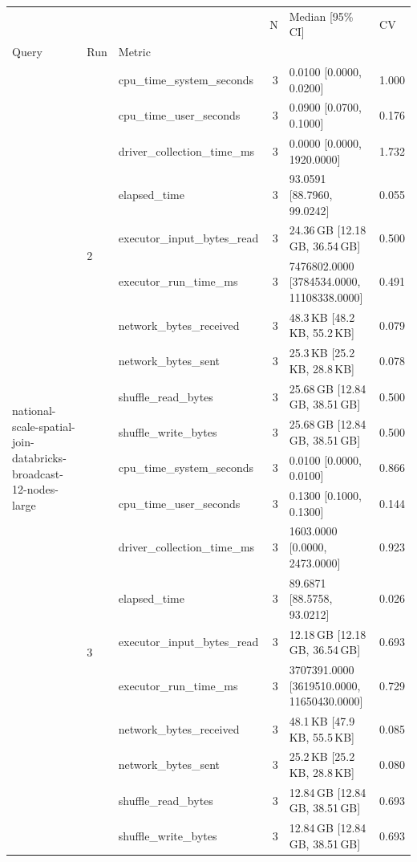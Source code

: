 \begin{tabular}{lllrll}
\toprule
 &  &  & N & Median [95\% CI] & CV \\
Query & Run & Metric &  &  &  \\
\midrule
\multirow[t]{20}{*}{national-scale-spatial-join-databricks-broadcast-12-nodes-large} & \multirow[t]{10}{*}{2} & cpu_time_system_seconds & 3 & 0.0100 [0.0000, 0.0200] & 1.000 \\
 &  & cpu_time_user_seconds & 3 & 0.0900 [0.0700, 0.1000] & 0.176 \\
 &  & driver_collection_time_ms & 3 & 0.0000 [0.0000, 1920.0000] & 1.732 \\
 &  & elapsed_time & 3 & 93.0591 [88.7960, 99.0242] & 0.055 \\
 &  & executor_input_bytes_read & 3 & 24.36\,GB [12.18\,GB, 36.54\,GB] & 0.500 \\
 &  & executor_run_time_ms & 3 & 7476802.0000 [3784534.0000, 11108338.0000] & 0.491 \\
 &  & network_bytes_received & 3 & 48.3\,KB [48.2\,KB, 55.2\,KB] & 0.079 \\
 &  & network_bytes_sent & 3 & 25.3\,KB [25.2\,KB, 28.8\,KB] & 0.078 \\
 &  & shuffle_read_bytes & 3 & 25.68\,GB [12.84\,GB, 38.51\,GB] & 0.500 \\
 &  & shuffle_write_bytes & 3 & 25.68\,GB [12.84\,GB, 38.51\,GB] & 0.500 \\
\cline{2-6}
 & \multirow[t]{10}{*}{3} & cpu_time_system_seconds & 3 & 0.0100 [0.0000, 0.0100] & 0.866 \\
 &  & cpu_time_user_seconds & 3 & 0.1300 [0.1000, 0.1300] & 0.144 \\
 &  & driver_collection_time_ms & 3 & 1603.0000 [0.0000, 2473.0000] & 0.923 \\
 &  & elapsed_time & 3 & 89.6871 [88.5758, 93.0212] & 0.026 \\
 &  & executor_input_bytes_read & 3 & 12.18\,GB [12.18\,GB, 36.54\,GB] & 0.693 \\
 &  & executor_run_time_ms & 3 & 3707391.0000 [3619510.0000, 11650430.0000] & 0.729 \\
 &  & network_bytes_received & 3 & 48.1\,KB [47.9\,KB, 55.5\,KB] & 0.085 \\
 &  & network_bytes_sent & 3 & 25.2\,KB [25.2\,KB, 28.8\,KB] & 0.080 \\
 &  & shuffle_read_bytes & 3 & 12.84\,GB [12.84\,GB, 38.51\,GB] & 0.693 \\
 &  & shuffle_write_bytes & 3 & 12.84\,GB [12.84\,GB, 38.51\,GB] & 0.693 \\

\end{tabular}
